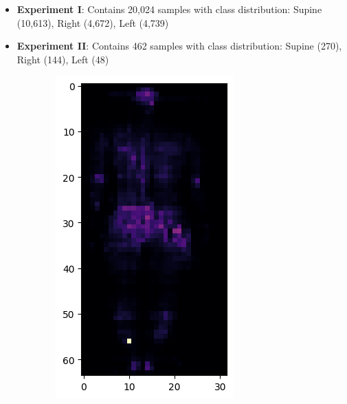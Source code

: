 \documentclass[10pt]{article}
\begin{document}
  \begin{itemize}
    \item \textbf{Experiment I}: Contains 20,024 samples with class distribution: Supine (10,613), Right (4,672), Left (4,739)
    \item \textbf{Experiment II}: Contains 462 samples with class distribution: Supine (270), Right (144), Left (48)
  \end{itemize}

  \begin{figure}[!h]
    \caption{Sample pressure images from both experiments}
    \label{fig:samples}
    \centering
    \begin{subfigure}{0.3\textwidth}
      \centering
      \includegraphics[width=\linewidth]{./EI_S1_F1.png}

\end{subfigure}
\end{figure}
\end{document}

